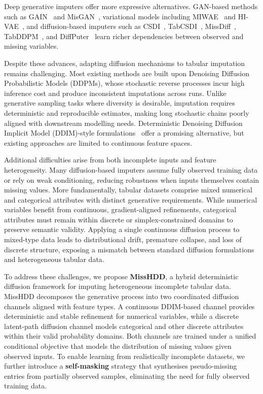 \documentclass[times, review, 10pt]{elsarticle}
\begin{document}
Deep generative imputers offer more expressive alternatives. GAN-based methods such as GAIN~\cite{yoon2018gain} and MisGAN~\cite{misGAN}, variational models including MIWAE~\cite{mattei2019miwae} and HI-VAE~\cite{hivae}, and diffusion-based imputers such as CSDI~\cite{csdi}, TabCSDI~\cite{tabcsdi}, MissDiff~\cite{missdiff}, TabDDPM~\cite{tabddpm}, and DiffPuter~\cite{diffputer} learn richer dependencies between observed and missing variables.

Despite these advances, adapting diffusion mechanisms to tabular imputation remains challenging. Most existing methods are built upon Denoising Diffusion Probabilistic Models (DDPMs), whose stochastic reverse processes incur high inference cost and produce inconsistent imputations across runs. Unlike generative sampling tasks where diversity is desirable, imputation requires deterministic and reproducible estimates, making long stochastic chains poorly aligned with downstream modelling needs. Deterministic Denoising Diffusion Implicit Model (DDIM)-style formulations~\cite{ddim,missddim} offer a promising alternative, but existing approaches are limited to continuous feature spaces.

Additional difficulties arise from both incomplete inputs and feature heterogeneity. Many diffusion-based imputers assume fully observed training data or rely on weak conditioning, reducing robustness when inputs themselves contain missing values. More fundamentally, tabular datasets comprise mixed numerical and categorical attributes with distinct generative requirements. While numerical variables benefit from continuous, gradient-aligned refinements, categorical attributes must remain within discrete or simplex-constrained domains to preserve semantic validity. Applying a single continuous diffusion process to mixed-type data leads to distributional drift, premature collapse, and loss of discrete structure, exposing a mismatch between standard diffusion formulations and heterogeneous tabular data.

To address these challenges, we propose \textbf{MissHDD}, a hybrid deterministic diffusion framework for imputing heterogeneous incomplete tabular data. MissHDD decomposes the generative process into two coordinated diffusion channels aligned with feature types. A continuous DDIM-based channel provides deterministic and stable refinement for numerical variables, while a discrete latent-path diffusion channel models categorical and other discrete attributes within their valid probability domains. Both channels are trained under a unified conditional objective that models the distribution of missing values given observed inputs. To enable learning from realistically incomplete datasets, we further introduce a \textbf{self-masking} strategy that synthesises pseudo-missing entries from partially observed samples, eliminating the need for fully observed training data.
\end{document}
